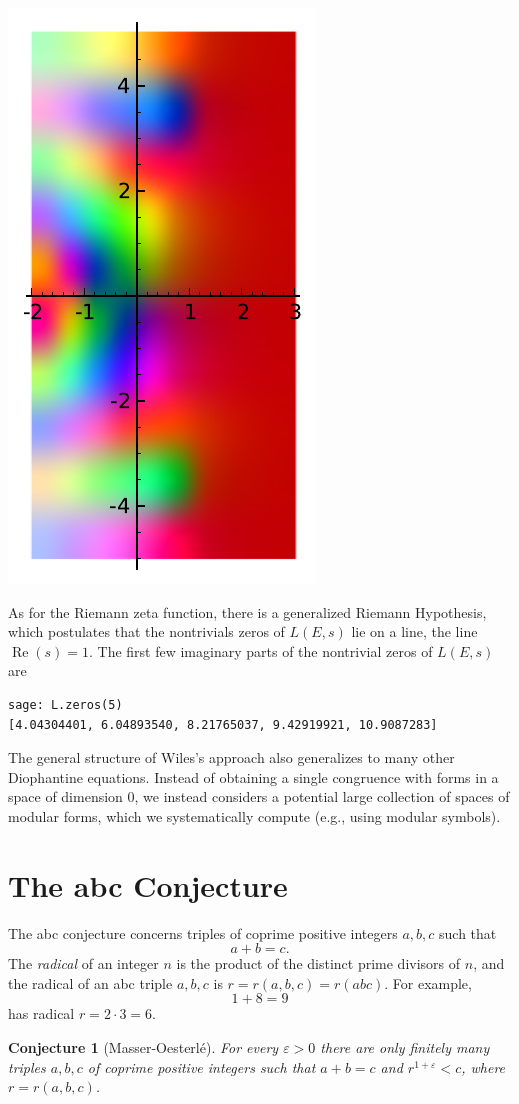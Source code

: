 \documentclass{book}
\theoremstyle{plain}
\newtheorem{conjecture}[theorem]{Conjecture}
\theoremstyle{definition}
\numberwithin{equation}{section}
\numberwithin{figure}{section}
\numberwithin{table}{section}
\DeclareMathOperator{\realpart}{Re}
\renewcommand{\Re}{\realpart}
\newcommand{\eps}{\varepsilon}
\begin{document}
\begin{center}
\includegraphics[width=.4\textwidth]{pics/27a-lser1.pdf}
\end{center}

As for the Riemann zeta function, there is a generalized Riemann
Hypothesis, which postulates that the nontrivials zeros of
$L(E,s)$ lie on a line, the line $\Re(s)=1$.
The first few imaginary parts of the nontrivial zeros of $L(E,s)$ are
\begin{lstlisting}
sage: L.zeros(5)
[4.04304401, 6.04893540, 8.21765037, 9.42919921, 10.9087283]
\end{lstlisting}

The general structure of Wiles's approach also generalizes to many other
Diophantine equations.  Instead of obtaining a single congruence with
forms in a space of dimension 0, we instead considers a potential
large collection of spaces of modular forms, which we systematically
compute (e.g., using modular symbols).

\section{The abc Conjecture}
The abc conjecture
concerns triples of coprime positive integers $a,b,c$  such that
$$
a+b = c.
$$
The {\em radical} of an integer $n$ is the product
of the distinct prime divisors of $n$, and the radical
of an abc triple $a,b,c$ is $r=r(a,b,c)=r(abc)$.
For example,
$$
  1 + 8 = 9
$$
has radical $r=2\cdot 3=6$.

\begin{conjecture}[Masser-Oesterl\'{e}]\label{conj:abc}
For every $\eps>0$ there are only finitely many
triples $a,b,c$ of coprime positive integers such
that $a+b=c$ and $r^{1+\eps}<c$,
where $r=r(a,b,c)$.
\end{conjecture}
\end{document}
